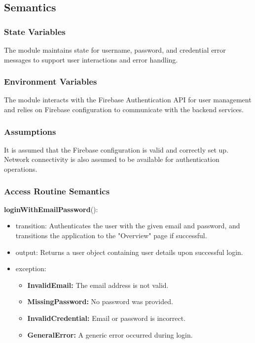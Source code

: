 \documentclass[12pt, titlepage]{article}
\begin{document}
\subsection{Semantics}

\subsubsection{State Variables}

The module maintains state for username, password, and credential error messages to support user interactions and error handling.

\subsubsection{Environment Variables}

The module interacts with the Firebase Authentication API for user management and relies on Firebase configuration to communicate with the backend services.

\subsubsection{Assumptions}

It is assumed that the Firebase configuration is valid and correctly set up. Network connectivity is also assumed to be available for authentication operations.

\subsubsection{Access Routine Semantics}

\noindent \textbf{loginWithEmailPassword}():
\begin{itemize}
\item transition: Authenticates the user with the given email and password, and transitions the application to the "Overview" page if successful.
\item output: Returns a user object containing user details upon successful login.
\item exception: 
    \begin{itemize}
        \item \textbf{InvalidEmail:} The email address is not valid.
        \item \textbf{MissingPassword:} No password was provided.
        \item \textbf{InvalidCredential:} Email or password is incorrect.
        \item \textbf{GeneralError:} A generic error occurred during login.
    \end{itemize}
\end{itemize}
\end{document}
